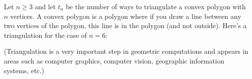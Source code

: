   Let $n \geq 3$ and let $t_n$ be the number of ways to triangulate a convex
  polygon
  with $n$ vertices.
  A convex polygon is a polygon where if you draw a line between any two
  vertices of the polygon, this line is in the polygon (and not outside).
  Here's a triangulation for the case of $n = 6$:
  
  (Triangulation is a very important step in geometric computations
  and appears in areas
  such as computer graphics, computer vision, geographic information
  systems, etc.)
